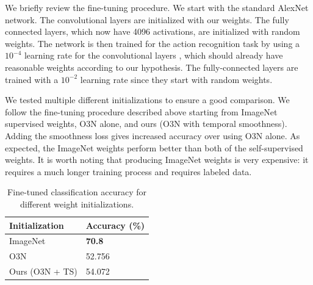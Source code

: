 We briefly review the fine-tuning procedure. We start with the standard AlexNet network. The convolutional layers are initialized with our weights. The fully connected layers, which now have 4096 activations, are initialized with random weights. The network is then trained for the action recognition task by using a $10^{-4}$ learning rate for the convolutional layers , which should already have reasonable weights according to our hypothesis. The fully-connected layers are trained with a $10^{-2}$ learning rate since they start with random weights. 

We tested multiple different initializations to ensure a good comparison. We follow the fine-tuning procedure described above starting from ImageNet supervised weights, O3N alone, and ours (O3N with temporal smoothness). Adding the smoothness loss gives increased accuracy over using O3N alone. As expected, the ImageNet weights perform better than both of the self-supervised weights. It is worth noting that producing ImageNet weights is very expensive: it requires a much longer training process and requires labeled data. 

\begin{table}
    \centering
    \begin{tabu} to 0.5\textwidth {|X[l]|X[c]|}
        \hline
        Initialization & Accuracy (\%) \\ \hline \hline
        ImageNet & \textbf{70.8} \\ \hline
        O3N & 52.756 \\ \hline
        Ours (O3N + TS) & 54.072 \\ \hline
    \end{tabu}
    \caption{Fine-tuned classification accuracy for different weight initializations.}
    \label{fig:classres}
\end{table}



